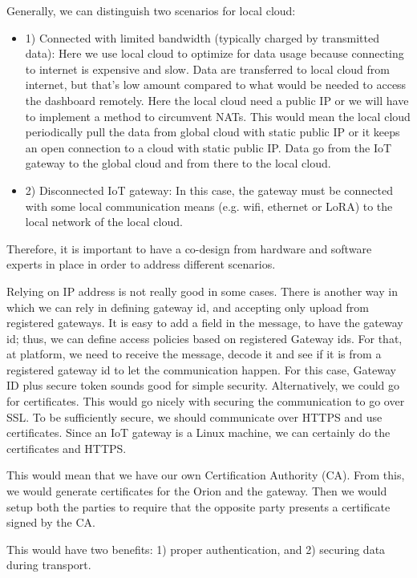 Generally, we can distinguish two scenarios for local cloud:
\begin{itemize}

\item 1) Connected with limited bandwidth (typically charged by transmitted data): Here we use local cloud to optimize for data usage because connecting to internet is expensive and slow. Data are transferred to local cloud from internet, but that's low amount compared to what would be needed to access the dashboard remotely. Here the local cloud need a public IP or we will have to implement a method to circumvent NATs. This would mean the local cloud periodically pull the data from global cloud with static public IP or it keeps an open connection to a cloud with static public IP. Data go from the IoT gateway to the global cloud and from there to the local cloud.

\item 2) Disconnected IoT gateway: In this case, the gateway must be connected with some local communication means (e.g. wifi, ethernet or LoRA) to the local network of the local cloud.
\end{itemize}

Therefore, it is important to have a co-design from hardware and software experts in place in order to address different scenarios.

Relying on IP address is not really good in some cases. There is another way in which we can rely in defining gateway id, and accepting only upload from registered gateways. It is easy to add a field in the message, to have the gateway id; thus, we can define access policies based on registered Gateway ids. For that, at platform, we need to receive the message, decode it and see if it is from a registered gateway id to let the communication happen. For this case, Gateway ID plus secure token sounds good for simple security. Alternatively, we could go for certificates. This would go nicely with securing the communication to go over SSL. To be sufficiently secure, we should communicate over HTTPS and use certificates. Since an IoT gateway is a Linux machine, we can certainly do the certificates and HTTPS.

This would mean that we have our own Certification Authority (CA). From this, we would generate certificates for the Orion and the gateway. Then we would setup both the parties to require that the opposite party presents a certificate signed by the CA.

This would have two benefits: 1) proper authentication, and 2) securing data during transport.